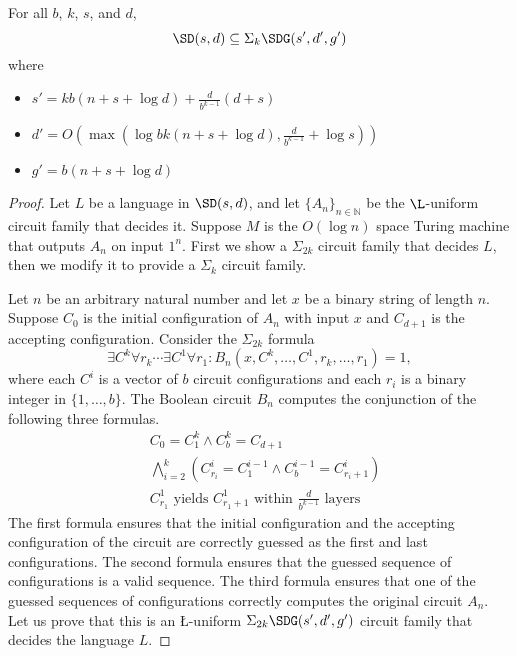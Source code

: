 \documentclass{article}
\begin{document}
\begin{lemma}
  For all $b$, $k$, $s$, and $d$,
  \begin{equation*}
    \SD(s, d) \subseteq \Sigma_k \SDG(s', d', g') %
  \end{equation*}
  where
  \begin{itemize}
  \item $s' = k b (n + s + \log d) + \frac{d}{b^{k - 1}}(d + s)$
  \item $d' = O(\max(\log b k (n + s + \log d), \frac{d}{b^{k - 1}} + \log s))$
  \item $g' = b (n + s + \log d)$
  \end{itemize}
\end{lemma}
\begin{proof}
  Let $L$ be a language in $\SD(s, d)$, and let $\{A_n\}_{n \in \mathbb{N}}$ be the $\L$-uniform circuit family that decides it.
  Suppose $M$ is the $O(\log n)$ space Turing machine that outputs $A_n$ on input $1^n$.
  First we show a $\Sigma_{2k}$ circuit family that decides $L$, then we modify it to provide a $\Sigma_k$ circuit family.

  Let $n$ be an arbitrary natural number and let $x$ be a binary string of length $n$.
  Suppose $C_0$ is the initial configuration of $A_n$ with input $x$ and $C_{d + 1}$ is the accepting configuration.
  Consider the $\Sigma_{2k}$ formula
  \begin{equation}\label{eq:2k}
    \exists C^k \forall r_k \dotsb \exists C^1 \forall r_1 \colon B_n(x, C^k, \dotsc, C^1, r_k, \dotsc, r_1) = 1,
  \end{equation}
  where each $C^i$ is a vector of $b$ circuit configurations and each $r_i$ is a binary integer in $\{1, \dotsc, b\}$.
  The Boolean circuit $B_n$ computes the conjunction of the following three formulas.
  \begin{align}
    & C_0 = C^k_1 \land C^k_b = C_{d + 1} \label{frm:1} \\
    & \bigwedge^k_{i = 2} \left(C^i_{r_i} = C^{i - 1}_1 \land C^{i - 1}_b = C^i_{r_i + 1} \right) \label{frm:2} \\
    & C^1_{r_1} \text{ yields } C^1_{r_1 + 1} \text{ within } \frac{d}{b^{k - 1}} \text{ layers} \label{frm:3}
  \end{align}
  The first formula ensures that the initial configuration and the accepting configuration of the circuit are correctly guessed as the first and last configurations.
  The second formula ensures that the guessed sequence of configurations is a valid sequence.
  The third formula ensures that one of the guessed sequences of configurations correctly computes the original circuit $A_n$.
  Let us prove that this is an \L-uniform $\Sigma_{2k} \SDG(s', d', g')$ circuit family that decides the language $L$.


\end{proof}
\end{document}

